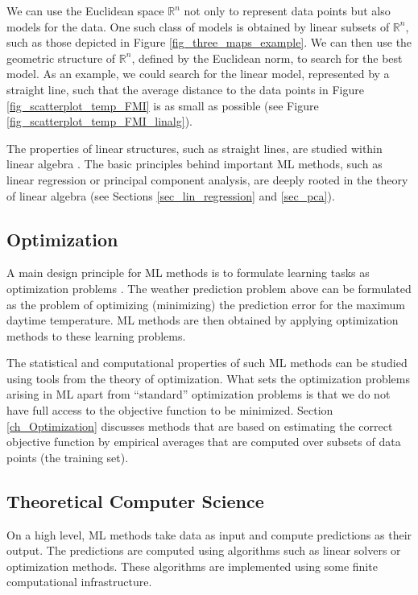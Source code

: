 \documentclass[12pt]{report}
\begin{document}
We can use the Euclidean space $\mathbb{R}^{n}$ not only to represent 
data points but also models for the data. One such class of models is 
obtained by linear subsets of $\mathbb{R}^{n}$, such as those depicted 
in Figure \ref{fig_three_maps_example}. We can then use the geometric 
structure of $\mathbb{R}^{n}$, defined by the Euclidean norm, to search 
for the best model. As an example, we could search for the linear model, 
represented by a straight line, such that the average distance to the data 
points in Figure \ref{fig_scatterplot_temp_FMI} is as small as possible 
(see Figure \ref{fig_scatterplot_temp_FMI_linalg}). 

The properties of linear structures, such as straight lines, are 
studied within linear algebra \cite{StrangLinAlg2016}. The basic 
principles behind important ML methods, such as linear regression 
or principal component analysis, are deeply rooted in the theory 
of linear algebra (see Sections \ref{sec_lin_regression} and \ref{sec_pca}).

\subsection{Optimization} 

A main design principle for ML methods is to formulate learning tasks as  
optimization problems \cite{OptMLBook}. The weather prediction problem 
above can be formulated as the problem of optimizing (minimizing) the 
prediction error for the maximum daytime temperature.  ML methods are 
then obtained by applying optimization methods to these learning problems. 

The statistical and computational properties of such ML methods can be 
studied using tools from the theory of optimization. What sets the optimization 
problems arising in ML apart from ``standard'' optimization problems is that 
we do not have full access to the objective function to be minimized. 
Section \ref{ch_Optimization} discusses methods that are based on estimating 
the correct objective function by empirical averages that 
are computed over subsets of data points (the training set). 

\subsection{Theoretical Computer Science} 

On a high level, ML methods take data as input and compute 
predictions as their output. The predictions are computed 
using algorithms such as linear solvers or optimization methods. 
These algorithms are implemented using some finite computational 
infrastructure. 
\end{document}
